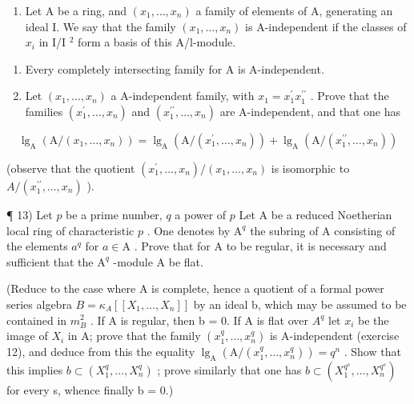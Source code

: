 \begin{enumerate}
\def\labelenumi{\arabic{enumi})}
\setcounter{enumi}{11}
\tightlist
\item
  Let A be a ring, and \((x_{1},\ldots,x_{n})\) a family of elements of A, generating an ideal I. We say that the family \((x_{1},\ldots,x_{n})\) is A-independent if the classes of \(x_{i}\) in I/I \(^{2}\) form a basis of this A/l-module.
\end{enumerate}

\begin{enumerate}
\def\labelenumi{\alph{enumi})}
\item
  Every completely intersecting family for A is A-independent.
\item
  Let \((x_{1},\ldots,x_{n})\) a A-independent family, with \(x_{1}=x_{1}^{\prime}x_{1}^{\prime\prime}\) . Prove that the families \((x_{1}^{\prime},\ldots,x_{n})\) and \((x_{1}^{\prime\prime},\ldots,x_{n})\) are A-independent, and that one has
\end{enumerate}

\[
\lg_ {\mathrm{A}} \left(\mathrm{A} / \left(x _ {1}, \dots , x _ {n}\right)\right) = \lg_ {\mathrm{A}} \left(\mathrm{A} / \left(x _ {1} ^ {\prime}, \dots , x _ {n}\right)\right) + \lg_ {\mathrm{A}} \left(\mathrm{A} / \left(x _ {1} ^ {\prime \prime}, \dots , x _ {n}\right)\right)
\]

(observe that the quotient \((x_{1}^{\prime},\ldots,x_{n})/(x_{1},\ldots,x_{n})\) is isomorphic to \(A/(x_{1}^{\prime\prime},\ldots,x_{n})\) ).

¶ 13) Let \(p\) be a prime number, \(q\) a power of \(p\) Let A be a reduced Noetherian local ring of characteristic \(p\) . One denotes by \(\mathrm{A}^q\) the subring of A consisting of the elements \(a^q\) for \(a \in \mathrm{A}\) . Prove that for A to be regular, it is necessary and sufficient that the \(\mathrm{A}^q\) -module A be flat.

(Reduce to the case where A is complete, hence a quotient of a formal power series algebra \(B = \kappa_{A}[[X_{1}, \ldots, X_{n}]]\) by an ideal b, which may be assumed to be contained in \(m_{B}^{2}\) . If A is regular, then b = 0. If A is flat over \(A^{q}\) let \(x_{i}\) be the image of \(X_{i}\) in A; prove that the family \((x_{1}^{q}, \ldots, x_{n}^{q})\) is A-independent (exercise 12), and deduce from this the equality \(\lg_{\mathrm{A}}(\mathrm{A}/(x_{1}^{q}, \ldots, x_{n}^{q})) = q^{n}\) . Show that this implies \(b \subset (X_{1}^{q}, \ldots, X_{n}^{q})\) ; prove similarly that one has \(b \subset (X_{1}^{q^{s}}, \ldots, X_{n}^{q^{s}})\) for every s, whence finally b = 0.)

